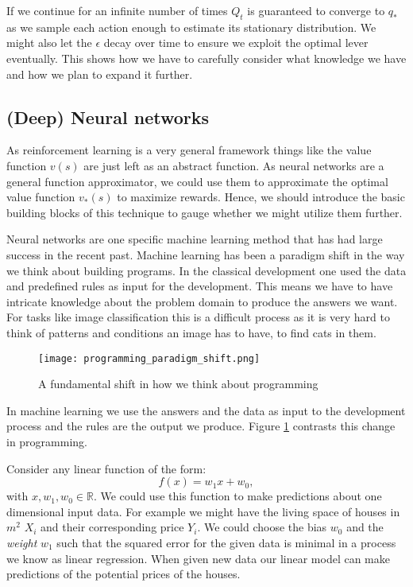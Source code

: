 If we continue for an infinite number of times $ Q_t $ is guaranteed to converge to $ q_{*} $ as we sample each action enough to estimate its stationary distribution. We might also let the $ \epsilon $ decay over time to ensure we exploit the optimal lever eventually. This shows how we have to carefully consider what knowledge we have and how we plan to expand it further.

\subsection{(Deep) Neural networks}
As reinforcement learning is a very general framework things like the value function $ v(s)$ are just left as an abstract function. As neural networks are a general function approximator, we could use them to approximate the optimal value function $ v_{*}(s) $ to maximize rewards. Hence, we should introduce the basic building blocks of this technique to gauge whether we might utilize them further.

Neural networks are one specific machine learning method that has had large success in the recent past. Machine learning has been a paradigm shift in the way we think about building programs. In the classical development one used the data and predefined rules as input for the development. This means we have to have intricate knowledge about the problem domain to produce the answers we want. For tasks like image classification this is a difficult process as it is very hard to think of patterns and conditions an image has to have, to find cats in them.

\begin{figure}
    \centering
    \texttt{[image: programming\_paradigm\_shift.png]}
    \caption{A fundamental shift in how we think about programming \cite[p. 5f.]{moroney_ai_2020}}
    \label{programming_paradigm_shift}
\end{figure}

In machine learning we use the answers and the data as input to the development process and the rules are the output we produce. Figure \ref{programming_paradigm_shift} contrasts this change in programming.

Consider any linear function of the form:
$$
    f(x) = w_1x + w_0,
$$
with $ x, w_1, w_0 \in \mathbb{R} $. We could use this function to make predictions about one dimensional input data. For example we might have the living space of houses in $ m^2 $ $ X_i $ and their corresponding price $ Y_i $. We could choose the bias $ w_0 $ and the \textit{weight} $ w_1 $ such that the squared error for the given data is minimal in a process we know as linear regression. When given new data our linear model can make predictions of the potential prices of the houses.


